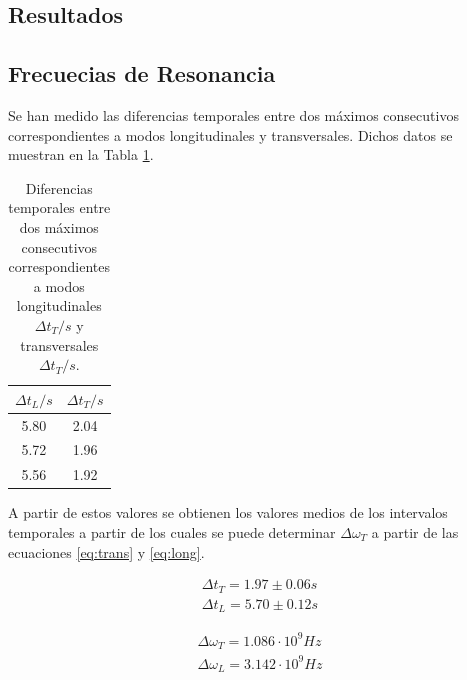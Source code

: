 \documentclass[twoside]{article}
\begin{document}
\begin{multicols}{2}
		\section{Resultados}

			\subsection{Frecuecias de Resonancia}

				Se han medido las diferencias temporales entre dos máximos consecutivos correspondientes a modos longitudinales y transversales. Dichos datos se muestran en la Tabla \ref{Tab:mods}.

					\begin{table}[H]
						\centering
						\begin{tabular}{c c}
							\hline
							\centering
								$\Delta t_L /s$ & $\Delta t_T /s$  \\ \hline
								5.80 & 2.04 \\
								5.72 & 1.96 \\
								5.56 & 1.92 \\ \hline
						\end{tabular}
						\caption{\label{Tab:mods}Diferencias temporales entre dos máximos consecutivos correspondientes a modos longitudinales $\Delta t_T /s$ y transversales $\Delta t_T /s$.}
					\end{table}

				A partir de estos valores se obtienen los valores medios de los intervalos temporales a partir de los cuales se puede determinar $\Delta \omega_T$ a partir de las ecuaciones \ref{eq:trans} y \ref{eq:long}.

					\begin{equation}
						\begin{matrix}
							\Delta t_T = 1.97 \pm 0.06 s \\

							\Delta t_L = 5.70 \pm 0.12 s							
						\end{matrix}
					\end{equation}

					\begin{equation}
						\begin{matrix}
							\Delta \omega_T = 1.086 \cdot 10^9 Hz \\

							\Delta \omega_L = 3.142 \cdot 10^9 Hz							
						\end{matrix}
					\end{equation}


\end{multicols}
\end{document}
